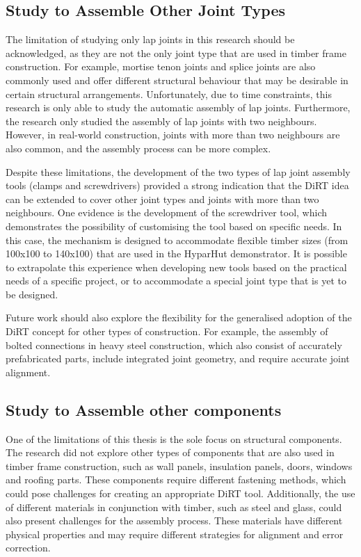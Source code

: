\subsection{Study to Assemble Other Joint Types}
\label{subsection:study-to-assemble-other-joint-types}

The limitation of studying only lap joints in this research should be acknowledged, as they are not the only joint type that are used in timber frame construction. For example, mortise tenon joints and splice joints are also commonly used and offer different structural behaviour that may be desirable in certain structural arrangements. Unfortunately, due to time constraints, this research is only able to study the automatic assembly of lap joints. Furthermore, the research only studied the assembly of lap joints with two neighbours. However, in real-world construction, joints with more than two neighbours are also common, and the assembly process can be more complex. 

Despite these limitations, the development of the two types of lap joint assembly tools (clamps and screwdrivers) provided a strong indication that the DiRT idea can be extended to cover other joint types and joints with more than two neighbours. One evidence is the development of the screwdriver tool, which demonstrates the possibility of customising the tool based on specific needs. In this case, the mechanism is designed to accommodate flexible timber sizes (from 100x100 to 140x100) that are used in the HyparHut demonstrator. It is possible to extrapolate this experience when developing new tools based on the practical needs of a specific project, or to accommodate a special joint type that is yet to be designed. 

Future work should also explore the flexibility for the generalised adoption of the DiRT concept for other types of construction. For example, the assembly of bolted connections in heavy steel construction, which also consist of accurately prefabricated parts, include integrated joint geometry, and require accurate joint alignment. 

\subsection{Study to Assemble other components}
\label{subsection:study-to-assemble-other-components}

One of the limitations of this thesis is the sole focus on structural components. The research did not explore other types of components that are also used in timber frame construction, such as wall panels, insulation panels, doors, windows and roofing parts. These components require different fastening methods, which could pose challenges for creating an appropriate DiRT tool. Additionally, the use of different materials in conjunction with timber, such as steel and glass, could also present challenges for the assembly process. These materials have different physical properties and may require different strategies for alignment and error correction.

